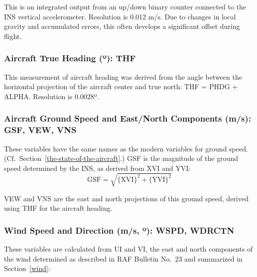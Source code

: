 \documentclass[
]{book}
\begin{document}
This is an integrated output from an up/down binary counter connected to the INS vertical accelerometer. Resolution is 0.012 m/s. Due to changes in local gravity and accumulated errors, this often develops a significant offset during flight.

\hypertarget{thf}{%
\subsubsection*{\texorpdfstring{Aircraft True Heading ({º}): THF}{Aircraft True Heading (º): THF}}\label{thf}}

This measurement of aircraft heading was derived from the angle between the horizontal projection of the aircraft center and true north: THF = PHDG + ALPHA. Resolution is 0.0028{º}.

\hypertarget{gsf-obsolete}{%
\subsubsection*{Aircraft Ground Speed and East/North Components (m/s): GSF, VEW, VNS}\label{gsf-obsolete}}

These variables have the same names as the modern variables for ground speed. (Cf.~Section~\ref{the-state-of-the-aircraft}.) GSF is the magnitude of the ground speed determined by the INS, as derived from XVI and YVI:\\

\begin{equation}
\mathrm{GSF=\sqrt{\{XVI\}^{2}+\{YVI\}^{2}}}
\label{eq:GSF}
\end{equation}

VEW and VNS are the east and north projections of this ground speed, derived using THF for the aircraft heading.

\hypertarget{wspd}{%
\subsubsection*{\texorpdfstring{Wind Speed and Direction (m/s, {º}): WSPD, WDRCTN}{Wind Speed and Direction (m/s, º): WSPD, WDRCTN}}\label{wspd}}

These variables are calculated from UI and VI, the east and north components of the wind determined as described in RAF Bulletin No.~23 and summarized in Section~\ref{wind}:
\end{document}
